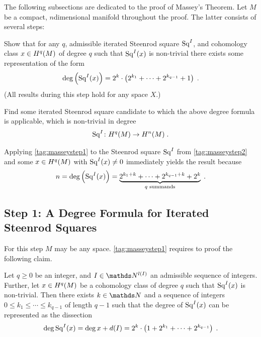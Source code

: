 The following subsections are dedicated to the proof of Massey's Theorem.
Let $M$ be a compact, $n$\nbd{}dimensional manifold throughout the proof.
The latter consists of several steps:
\begin{steps}
\item\label{tag:masseystep1} 
  Show that for any $q$, admissible iterated Steenrod square $\mathrm{Sq}^{I}$, and cohomology
  class $x\in H^q(M)$ of degree $q$ such that $\mathrm{Sq}^{I}(x)$ is non-trivial there exists
  some representation of the form
  \begin{gather*}
    \deg \left(\mathrm{Sq}^{I}(x)\right)
    = 2^k\cdot
    \left( 2^{k_1}+\dotsb+2^{k_{q-1}} + 1 \right)
    \;.
  \end{gather*}
  (All results during this step hold for any space $X$.)
\item\label{tag:masseystep2}
  Find some iterated Steenrod square candidate to which the above
  degree formula is applicable, \idest which is non-trivial in
  degree
  \begin{gather*}
    \mathrm{Sq}^{I}\colon H^q(M)\to H^n(M)
    \;.
  \end{gather*}
\end{steps}
Applying \ref{tag:masseystep1} to the Steenrod square $\mathrm{Sq}^{I}$ from
\ref{tag:masseystep2} and some $x\in H^q(M)$ with $\mathrm{Sq}^{I}(x)\neq 0$
immediately yields the result because
\begin{gather*}
  n = \deg\left(\mathrm{Sq}^{I}(x)\right) = \underbrace
  {2^{k_1+k}+\dotsb+2^{k_{q-1}+k} + 2^{k}}_{\text{$q$ summands}}
  \;.
\end{gather*}

\subsection[A Degree Formula for Iterated Steenrod Squares]
{Step 1: A Degree Formula for Iterated Steenrod Squares}
For this step $M$ may be any space.
\ref{tag:masseystep1} requires to proof the following claim.
\begin{Lem}[\ref{tag:masseystep1}]\label{lem:masseystep1}
  Let $q\geq 0$ be an integer,
  and $I\in\Nat^{\l(I)}$ an admissible sequence of integers.
  Further, let $x\in H^q(M)$ be a cohomology class of degree $q$
  such that $\mathrm{Sq}^{I}(x)$ is non-trivial.
  Then there exists $k\in\Nat$ and a sequence of integers
  $0\leq k_1\leq\dotsb\leq k_{q-1}$ of length $q-1$ such that the
  degree of $\mathrm{Sq}^{I}(x)$ can be represented as the dissection
  \begin{gather*}
    \deg \mathrm{Sq}^{I}(x)
    = \deg x + d(I)
    = 2^k\cdot
    \left( 1 + 2^{k_1}+\dotsb+2^{k_{q-1}} \right)
    \;.
  \end{gather*}
\end{Lem}

